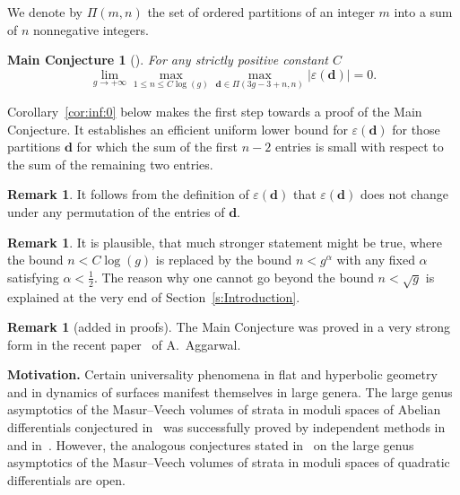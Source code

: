 \documentclass[pdftex]{sigma}
\renewcommand{\epsilon}{\varepsilon}
\newtheorem*{MConjecture}{Main Conjecture}
\theoremstyle{definition}
\newtheorem{Remark}[Theorem]{Remark}
\begin{document}
We denote by $\Pi(m,n)$ the
set of ordered partitions of an integer $m$ into a sum of $n$ nonnegative integers.

\begin{MConjecture}[\cite{DGZZ:volume}]
For any strictly positive constant $C$
\[
\lim_{g\to+\infty}
\max_{1\le n\le C\log(g)}
\max_{\boldsymbol{d}\in\Pi(3g-3+n,n)}
|\epsilon(\boldsymbol{d})|=0 .
\]
\end{MConjecture}

Corollary~\ref{cor:inf:0} below makes the
first step towards a proof of the Main Conjecture. It
establishes an efficient uniform lower bound for
$\epsilon(\boldsymbol{d})$ for those partitions
$\boldsymbol{d}$ for which the sum of the first $n-2$
entries is small with respect to the sum of the remaining
two entries.

\begin{Remark}\label{rm:permutation:of:d}
It follows from the definition of $\epsilon(\boldsymbol{d})$ that $\epsilon(\boldsymbol{d})$ does not change under any permutation of the entries of $\boldsymbol{d}$.
\end{Remark}

\begin{Remark}\label{rm:alpha:1:2}
It is plausible, that much stronger statement might be
true, where the bound $n<C\log(g)$ is replaced by the bound
$n<g^\alpha$ with any fixed $\alpha$ satisfying
$\alpha<\frac{1}{2}$. The reason why one
cannot go beyond the bound $n<\sqrt{g}$ is explained at the
very end of Section~\ref{s:Introduction}.
\end{Remark}

\begin{Remark}[added in proofs]\label{rm:Aggarwal}
The Main Conjecture was proved in a very strong form in the
recent paper~\cite{Aggarwal:intersection:numbers} of
A.~Aggarwal.
\end{Remark}

\textbf{Motivation.}
Certain universality phenomena in flat and hyperbolic
geometry and in dynamics of surfaces manifest themselves in
large genera. The large genus asymptotics of the
Masur--Veech volumes of strata in moduli spaces of Abelian
differentials conjectured in~\cite{Eskin:Zorich} was
successfully proved by independent methods
in~\cite{Aggarwal:Volumes} and
in~\cite{Chen:Moeller:Sauvaget:Zagier}.
However, the analogous conjectures stated
in~\cite{ADGZZ:conjecture} on the large genus asymptotics
of the Masur--Veech volumes of strata in moduli spaces of
quadratic differentials are open.
\end{document}
